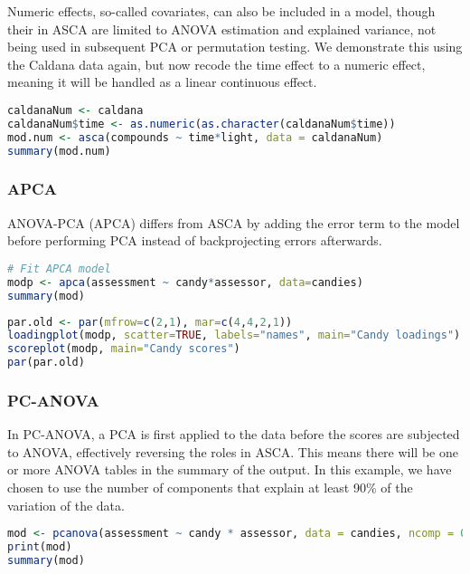 \label{numeric-effects}
Numeric effects, so-called covariates, can also be included in a model, though their
in ASCA are limited to ANOVA estimation and explained variance, not being used in
subsequent PCA or permutation testing. We demonstrate this using the Caldana data
again, but now recode the time effect to a numeric effect, meaning it will be
handled as a linear continuous effect.

\begin{lstlisting}[language=R, columns=fullflexible, basicstyle=\linespread{0.85}\small\ttfamily, stringstyle=\color{DarkGreen}, keywordstyle=\color{blue}, commentstyle=\color{DarkGreen},]
caldanaNum <- caldana
caldanaNum$time <- as.numeric(as.character(caldanaNum$time))
mod.num <- asca(compounds ~ time*light, data = caldanaNum)
summary(mod.num)
\end{lstlisting}

\subsubsection{APCA}\label{apca}

ANOVA-PCA (APCA) differs from ASCA by adding the error term to the model
before performing PCA instead of backprojecting errors afterwards.

\begin{lstlisting}[language=R, columns=fullflexible, basicstyle=\linespread{0.85}\small\ttfamily, stringstyle=\color{DarkGreen}, keywordstyle=\color{blue}, commentstyle=\color{DarkGreen},]
# Fit APCA model
modp <- apca(assessment ~ candy*assessor, data=candies)
summary(mod)
\end{lstlisting}

\begin{lstlisting}[language=R, columns=fullflexible, basicstyle=\linespread{0.85}\small\ttfamily, stringstyle=\color{DarkGreen}, keywordstyle=\color{blue}, commentstyle=\color{DarkGreen},]
par.old <- par(mfrow=c(2,1), mar=c(4,4,2,1))
loadingplot(modp, scatter=TRUE, labels="names", main="Candy loadings")
scoreplot(modp, main="Candy scores")
par(par.old)
\end{lstlisting}

\subsubsection{PC-ANOVA}\label{pc-anova}

In PC-ANOVA, a PCA is first applied to the data before the scores are
subjected to ANOVA, effectively reversing the roles in ASCA. This means
there will be one or more ANOVA tables in the summary of the output. In
this example, we have chosen to use the number of components that
explain at least 90\% of the variation of the data.
\begin{lstlisting}[language=R, columns=fullflexible, basicstyle=\linespread{0.85}\small\ttfamily, stringstyle=\color{DarkGreen}, keywordstyle=\color{blue}, commentstyle=\color{DarkGreen},]
mod <- pcanova(assessment ~ candy * assessor, data = candies, ncomp = 0.9)
print(mod)
summary(mod)
\end{lstlisting}

